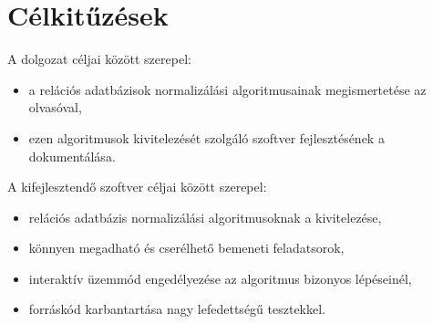 \chapter{Célkitűzések}

A dolgozat céljai között szerepel:

\begin{itemize}
    \item a relációs adatbázisok normalizálási algoritmusainak megismertetése az olvasóval,
    \item ezen algoritmusok kivitelezését szolgáló szoftver fejlesztésének a dokumentálása.
\end{itemize}


A kifejlesztendő szoftver céljai között szerepel:

\begin{itemize}
    \item relációs adatbázis normalizálási algoritmusoknak a kivitelezése,
    \item könnyen megadható és cserélhető bemeneti feladatsorok,
    \item interaktív üzemmód engedélyezése az algoritmus bizonyos lépéseinél,
    \item forráskód karbantartása nagy lefedettségű tesztekkel.
\end{itemize}
	